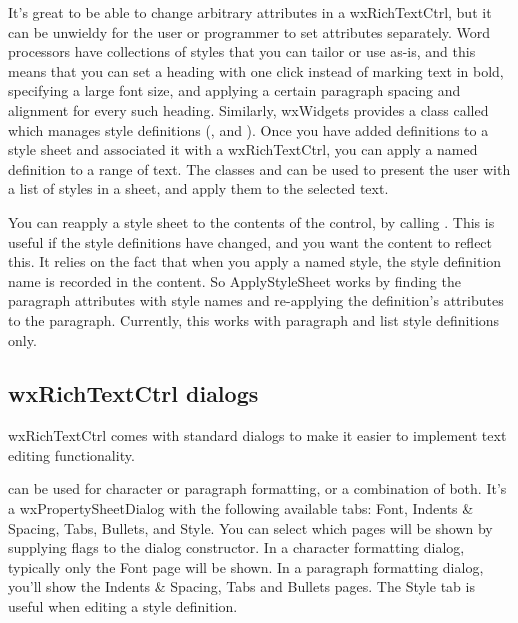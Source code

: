 It's great to be able to change arbitrary attributes in a wxRichTextCtrl, but
it can be unwieldy for the user or programmer to set attributes separately. Word processors have collections
of styles that you can tailor or use as-is, and this means that you can set a heading with one click
instead of marking text in bold, specifying a large font size, and applying a certain
paragraph spacing and alignment for every such heading. Similarly,
wxWidgets provides a class called  which manages style definitions
(,  and ).
Once you have added definitions to a style sheet and associated it with a wxRichTextCtrl,
you can apply a named definition to a range of text. The classes \rtfsp
and  can be used to present the user with a list
of styles in a sheet, and apply them to the selected text.

You can reapply a style sheet to the contents of the control, by calling .
This is useful if the style definitions have changed, and you want the content to reflect this.
It relies on the fact that when you apply a named style, the style definition name is recorded in the
content. So ApplyStyleSheet works by finding the paragraph attributes with style names and re-applying the definition's
attributes to the paragraph. Currently, this works with paragraph and list style definitions only.

\subsection{wxRichTextCtrl dialogs}\label{wxrichtextctrldialogs}

wxRichTextCtrl comes with standard dialogs to make it easier to implement
text editing functionality.

 can be used
for character or paragraph formatting, or a combination of both. It's a wxPropertySheetDialog
with the following available tabs: Font, Indents \& Spacing, Tabs, Bullets, and Style.
You can select which pages will be shown by supplying flags to the dialog constructor.
In a character formatting dialog, typically only the Font page will be shown.
In a paragraph formatting dialog, you'll show the Indents \& Spacing, Tabs and Bullets
pages. The Style tab is useful when editing a style definition.

